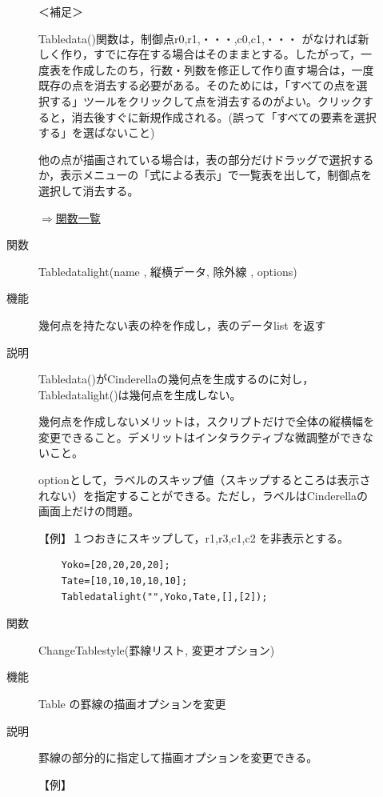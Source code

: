 \documentclass[papersize,a4paper,12pt,uplatex]{jsarticle}
\begin{document}
\begin{description}
\begin{description}
\vspace{\baselineskip}
＜補足＞

Tabledata()関数は，制御点r0,r1,・・・,c0,c1,・・・  がなければ新しく作り，すでに存在する場合はそのままとする。したがって，一度表を作成したのち，行数・列数を修正して作り直す場合は，一度既存の点を消去する必要がある。そのためには，「すべての点を選択する」ツールをクリックして点を消去するのがよい。クリックすると，消去後すぐに新規作成される。(誤って「すべての要素を選択する」を選ばないこと)
  
他の点が描画されている場合は，表の部分だけドラッグで選択するか，表示メニューの「式による表示」で一覧表を出して，制御点を選択して消去する。

\begin{flushright}  \hyperlink{functionlist}{$\Rightarrow$関数一覧}\end{flushright}

\vspace{\baselineskip}
\hypertarget{tabledatalight}{}
\item[関数]  Tabledatalight(name , 縦横データ, 除外線 , options)
\item[機能]  幾何点を持たない表の枠を作成し，表のデータlist を返す
\item[説明]  Tabledata()がCinderellaの幾何点を生成するのに対し，Tabledatalight()は幾何点を生成しない。

幾何点を作成しないメリットは，スクリプトだけで全体の縦横幅を変更できること。デメリットはインタラクティブな微調整ができないこと。
  
optionとして，ラベルのスキップ値（スキップするところは表示されない）を指定することができる。ただし，ラベルはCinderellaの画面上だけの問題。
  
\vspace{\baselineskip}
  【例】１つおきにスキップして，r1,r3,c1,c2 を非表示とする。
\begin{verbatim}
    Yoko=[20,20,20,20];
    Tate=[10,10,10,10,10];
    Tabledatalight("",Yoko,Tate,[],[2]);
\end{verbatim}
        
\vspace{\baselineskip}
\hypertarget{changetablestyle}{}
\item[関数]  ChangeTablestyle(罫線リスト, 変更オプション)
\item[機能]  Table の罫線の描画オプションを変更
\item[説明]  罫線の部分的に指定して描画オプションを変更できる。

\vspace{\baselineskip}
【例】


\end{description}
\end{description}
\end{document}

